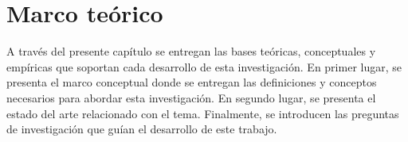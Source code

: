 
\chapter{Marco teórico}
\label{chp:marco_teorico}
A través del presente capítulo se entregan las bases teóricas, conceptuales y empíricas que soportan cada desarrollo de esta investigación. En primer lugar, se presenta el marco conceptual donde se entregan las definiciones y conceptos necesarios para abordar esta investigación. En segundo lugar, se presenta el estado del arte relacionado con el tema. Finalmente, se introducen las preguntas de investigación que guían el desarrollo de este trabajo.




